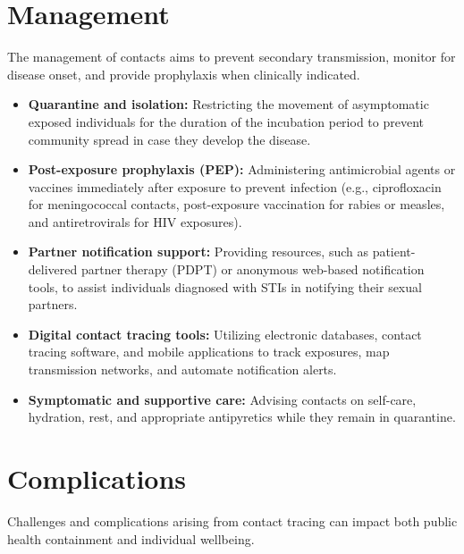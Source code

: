 \section*{Management}
The management of contacts aims to prevent secondary transmission, monitor for disease onset, and provide prophylaxis when clinically indicated.

\begin{itemize}
    \item \textbf{Quarantine and isolation:} Restricting the movement of asymptomatic exposed individuals for the duration of the incubation period to prevent community spread in case they develop the disease.
    \item \textbf{Post-exposure prophylaxis (PEP):} Administering antimicrobial agents or vaccines immediately after exposure to prevent infection (e.g., ciprofloxacin for meningococcal contacts, post-exposure vaccination for rabies or measles, and antiretrovirals for HIV exposures).
    \item \textbf{Partner notification support:} Providing resources, such as patient-delivered partner therapy (PDPT) or anonymous web-based notification tools, to assist individuals diagnosed with STIs in notifying their sexual partners.
    \item \textbf{Digital contact tracing tools:} Utilizing electronic databases, contact tracing software, and mobile applications to track exposures, map transmission networks, and automate notification alerts.
    \item \textbf{Symptomatic and supportive care:} Advising contacts on self-care, hydration, rest, and appropriate antipyretics while they remain in quarantine.
\end{itemize}

\section*{Complications}
Challenges and complications arising from contact tracing can impact both public health containment and individual wellbeing.

